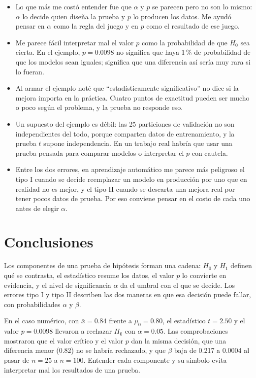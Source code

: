 \documentclass[11pt,letterpaper]{article}
\begin{document}
\begin{itemize}
    \item Lo que más me costó entender fue que $\alpha$ y $p$ se parecen pero no son lo mismo: $\alpha$ lo decide quien diseña la prueba y $p$ lo producen los datos. Me ayudó pensar en $\alpha$ como la regla del juego y en $p$ como el resultado de ese juego.
    \item Me parece fácil interpretar mal el valor $p$ como la probabilidad de que $H_0$ sea cierta. En el ejemplo, $p = 0.0098$ no significa que haya 1\,\% de probabilidad de que los modelos sean iguales; significa que una diferencia así sería muy rara si lo fueran.
    \item Al armar el ejemplo noté que ``estadísticamente significativo'' no dice si la mejora importa en la práctica. Cuatro puntos de exactitud pueden ser mucho o poco según el problema, y la prueba no responde eso.
    \item Un supuesto del ejemplo es débil: las 25 particiones de validación no son independientes del todo, porque comparten datos de entrenamiento, y la prueba $t$ supone independencia. En un trabajo real habría que usar una prueba pensada para comparar modelos o interpretar el $p$ con cautela.
    \item Entre los dos errores, en aprendizaje automático me parece más peligroso el tipo I cuando se decide reemplazar un modelo en producción por uno que en realidad no es mejor, y el tipo II cuando se descarta una mejora real por tener pocos datos de prueba. Por eso conviene pensar en el costo de cada uno antes de elegir $\alpha$.
\end{itemize}

\section{Conclusiones}

Los componentes de una prueba de hipótesis forman una cadena: $H_0$ y $H_1$ definen qué se contrasta, el estadístico resume los datos, el valor $p$ lo convierte en evidencia, y el nivel de significancia $\alpha$ da el umbral con el que se decide. Los errores tipo I y tipo II describen las dos maneras en que esa decisión puede fallar, con probabilidades $\alpha$ y $\beta$.

En el caso numérico, con $\bar{x} = 0.84$ frente a $\mu_0 = 0.80$, el estadístico $t = 2.50$ y el valor $p = 0.0098$ llevaron a rechazar $H_0$ con $\alpha = 0.05$. Las comprobaciones mostraron que el valor crítico y el valor $p$ dan la misma decisión, que una diferencia menor (0.82) no se habría rechazado, y que $\beta$ baja de 0.217 a 0.0004 al pasar de $n = 25$ a $n = 100$. Entender cada componente y su símbolo evita interpretar mal los resultados de una prueba.

\end{document}
